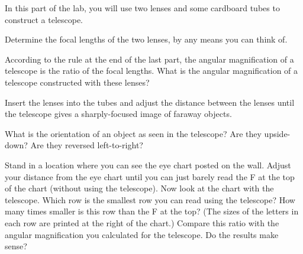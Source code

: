 In this part of the lab, you will use two lenses and some cardboard tubes
to construct a telescope.  

Determine the focal lengths of the two lenses, by any means you 
can think of.

\answerspace{1in}

According to the rule at the end of the last part, the angular
magnification of a telescope is the ratio of the focal lengths.
What is the angular magnification of a telescope constructed with
these lenses?

\answerspace{1in}

Insert the lenses into the tubes and adjust the distance between the lenses
until the telescope gives a sharply-focused image of faraway objects.

What is the orientation of an object as seen in the telescope?  Are
they upside-down?  Are they reversed left-to-right?

\answerspace{1in}

Stand in a location where you can see the eye chart posted on the wall.
Adjust your distance from the eye chart until you can just barely
read the F at the top of the chart (without using the telescope).
Now look at the chart with the telescope.  Which row is the
smallest row you can read using the telescope?  How many times
smaller is this row than the F at the top?  (The sizes of the letters
in each row are printed at the right of the chart.)
Compare this ratio with the angular magnification you calculated
for the telescope.  Do the results make sense?



